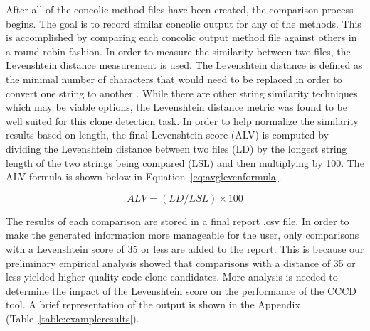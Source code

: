 \documentclass[conference]{IEEEtran}
\begin{document}
After all of the concolic method files have been created, the comparison process begins. The goal is to record similar concolic output for any of the methods. This is accomplished by comparing each concolic output method file against others in a round robin fashion. In order to measure the similarity between two files, the Levenshtein distance measurement is used. The Levenshtein distance is defined as the minimal number of characters that would need to be replaced in order to convert one string to another \cite{Bard:2007:STO:1274531.1274545}. While there are other string similarity techniques which may be viable options, the Levenshtein distance metric was found to be well suited for this clone detection task. In order to help normalize the similarity results based on length, the final Levenshtein score (ALV) is computed by dividing the Levenshtein distance between two files (LD) by the longest string length of the two strings being compared (LSL) and then multiplying by 100.  The ALV formula is shown below in Equation~\ref{eq:avglevenformula}.


\begin{equation} \label{eq:avglevenformula} 
ALV = (LD/LSL) \times 100     
\end{equation}




%	
%



The results of each comparison are stored in a final report .csv file. In order to make the generated information more manageable for the user, only comparisons with a Levenshtein score of 35 or less are added to the report. This is because our preliminary empirical analysis showed that comparisons with a distance of 35 or less yielded higher quality code clone candidates. More analysis is needed to determine the impact of the  Levenshtein score on the performance of the CCCD tool. A brief representation of the output is shown in the Appendix (Table~\ref{table:exampleresults}).
\end{document}
